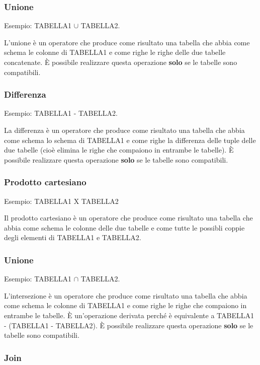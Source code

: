\documentclass[\main/main.tex]{subfiles}
\begin{document}
\subsubsection{Unione}

Esempio: TABELLA1 $\cup$ TABELLA2.

L'unione è un operatore che produce come risultato una tabella che abbia come schema le colonne di TABELLA1 e come righe le righe delle due tabelle concatenate.
È possibile realizzare questa operazione \textbf{solo} se le tabelle sono compatibili.

\subsubsection{Differenza}

Esempio: TABELLA1 - TABELLA2.

La differenza è un operatore che produce come risultato una tabella che abbia come schema lo schema di TABELLA1 e come righe la differenza delle tuple delle due tabelle (cioè elimina le righe che compaiono in entrambe le tabelle).
È possibile realizzare questa operazione \textbf{solo} se le tabelle sono compatibili.


\subsubsection{Prodotto cartesiano}

Esempio: TABELLA1 X TABELLA2

Il prodotto cartesiano è un operatore che produce come risultato una tabella che abbia come schema le colonne delle due tabelle e come tutte le possibli coppie degli elementi di TABELLA1 e TABELLA2.

\subsubsection{Unione}

Esempio: TABELLA1 $\cap$ TABELLA2.

L'intersezione è un operatore che produce come risultato una tabella che abbia come schema le colonne di TABELLA1 e come righe le righe che compaiono in entrambe le tabelle.
È un'operazione derivata perché è equivalente a TABELLA1 - (TABELLA1 - TABELLA2).
È possibile realizzare questa operazione \textbf{solo} se le tabelle sono compatibili.


\subsubsection{Join}
\end{document}
